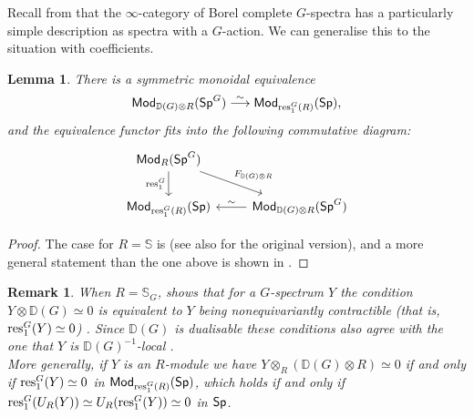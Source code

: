 \documentclass[reqno]{amsart}
\numberwithin{equation}{section}\theoremstyle{thms}
\newtheorem{lem}[equation]{Lemma}
\theoremstyle{defn}
\newtheorem{rem}[equation]{Remark}
\newcommand{\bD}{\mathbb{D}}
\newcommand{\bS}{\mathbb{S}}
\newcommand{\tn}[1]{\textnormal{#1}}
\newcommand{\tsf}[1]{\textsf{\textup{#1}}}
\newcommand{\Mod}{\tsf{Mod}}
\newcommand{\spec}{\tsf{Sp}}
\newcommand{\specg}{\tsf{Sp}^G}
\begin{document}
Recall from \cite[Proposition 6.17]{mnn17} that the $\infty$-category of Borel complete $G$-spectra has a particularly simple description as spectra with a $G$-action. We can generalise this to the situation with coefficients. 

\begin{lem}\label{lem:resasbasechange}
There is a symmetric monoidal equivalence 
$$\Mod_{\bD(G)\otimes R}(\specg) \stackrel{\sim}{\longrightarrow} \Mod_{\tn{res}^G_1(R)}(\spec),$$
and the equivalence functor fits into the following commutative diagram:
\[\begin{tikzcd}
	{\Mod_{R}(\specg)} & \\
	{\Mod_{\tn{res}^G_1(R)}(\spec)} & {\Mod_{\bD(G)\otimes R}(\specg)}
	\arrow["{\tn{res}^G_1}"', from=1-1, to=2-1]
	\arrow["{F_{\bD(G) \otimes R}}", from=1-1, to=2-2]
	\arrow["\sim"', from=2-2, to=2-1]
\end{tikzcd}\]
\end{lem}
\begin{proof}
The case for $R = \bS$ is \cite[Theorem 5.32]{mnn17} (see also \cite[Theorem 1.1]{bds15} for the original version), and a more general statement than the one above is shown in \cite[Proposition 3.9]{bchnl25}.
\end{proof}

\begin{rem}\label{rem:nonequivariantlycontractible}
When $R = \bS_G$,  shows that for a $G$-spectrum $Y$ the condition $Y \otimes \bD(G) \simeq 0$  is equivalent to $Y$ being \emph{nonequivariantly contractible} (that is, $\tn{res}^G_1(Y) \simeq 0$) \cite[Proposition 6.15]{mnn17}. Since $\bD(G)$ is dualisable these conditions also agree with the one that $Y$ is \emph{$\bD(G)^{-1}$-local} \cite[§3.2]{mnn17}. \\
More generally, if $Y$ is an $R$-module we have $Y \otimes_R (\bD(G) \otimes R) \simeq 0$ if and only if $\tn{res}^G_1(Y) \simeq 0$ in $\Mod_{\tn{res}^G_1(R)}(\spec)$, which holds if and only if $\tn{res}^G_1(U_R(Y)) \simeq U_R(\tn{res}^G_1(Y)) \simeq 0$ in $\spec$.
\end{rem}
\end{document}
